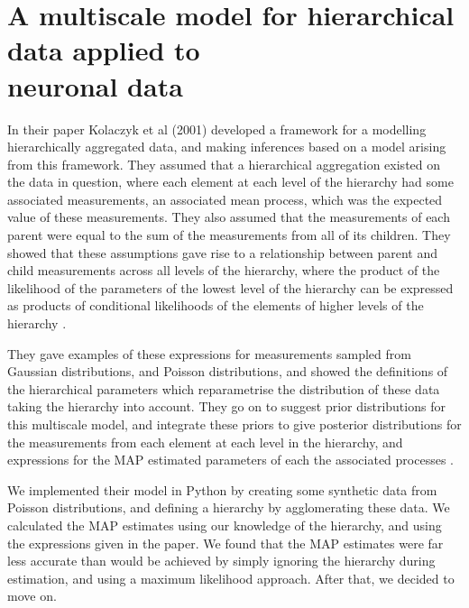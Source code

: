 \section{A multiscale model for hierarchical data applied to \\ neuronal data}
In their paper Kolaczyk et al (2001) developed a framework for a modelling hierarchically aggregated data, and making inferences based on a model arising from this framework. They assumed that a hierarchical aggregation existed on the data in question, where each element at each level of the hierarchy had some associated measurements, an associated mean process, which was the expected value of these measurements. They also assumed that the measurements of each parent were equal to the sum of the measurements from all of its children. They showed that these assumptions gave rise to a relationship between parent and child measurements across all levels of the hierarchy, where the product of the likelihood of the parameters of the lowest level of the hierarchy can be expressed as products of conditional likelihoods of the elements of higher levels of the hierarchy \parencite{kolaczyk}.

They gave examples of these expressions for measurements sampled from Gaussian distributions, and Poisson distributions, and showed the definitions of the hierarchical parameters which reparametrise the distribution of these data taking the hierarchy into account. They go on to suggest prior distributions for this multiscale model, and integrate these priors to give posterior distributions for the measurements from each element at each level in the hierarchy, and expressions for the MAP estimated parameters of each the associated processes \parencite{kolaczyk}.

We implemented their model in Python by creating some synthetic data from Poisson distributions, and defining a hierarchy by agglomerating these data. We calculated the MAP estimates using our knowledge of the hierarchy, and using the expressions given in the paper. We found that the MAP estimates were far less accurate than would be achieved by simply ignoring the hierarchy during estimation, and using a maximum likelihood approach. After that, we decided to move on.
